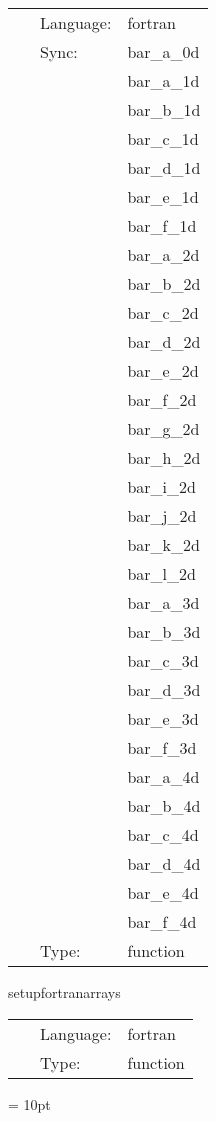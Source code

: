 \hspace{5mm}{\it use fortran arrays } 


\hspace{5mm}

 \begin{tabular*}{160mm}{cll} 
~ & Language:  & fortran \\ 
~ & Sync:  & bar\_a\_0d \\ 
~& ~ &bar\_a\_1d\\ 
~& ~ &bar\_b\_1d\\ 
~& ~ &bar\_c\_1d\\ 
~& ~ &bar\_d\_1d\\ 
~& ~ &bar\_e\_1d\\ 
~& ~ &bar\_f\_1d\\ 
~& ~ &bar\_a\_2d\\ 
~& ~ &bar\_b\_2d\\ 
~& ~ &bar\_c\_2d\\ 
~& ~ &bar\_d\_2d\\ 
~& ~ &bar\_e\_2d\\ 
~& ~ &bar\_f\_2d\\ 
~& ~ &bar\_g\_2d\\ 
~& ~ &bar\_h\_2d\\ 
~& ~ &bar\_i\_2d\\ 
~& ~ &bar\_j\_2d\\ 
~& ~ &bar\_k\_2d\\ 
~& ~ &bar\_l\_2d\\ 
~& ~ &bar\_a\_3d\\ 
~& ~ &bar\_b\_3d\\ 
~& ~ &bar\_c\_3d\\ 
~& ~ &bar\_d\_3d\\ 
~& ~ &bar\_e\_3d\\ 
~& ~ &bar\_f\_3d\\ 
~& ~ &bar\_a\_4d\\ 
~& ~ &bar\_b\_4d\\ 
~& ~ &bar\_c\_4d\\ 
~& ~ &bar\_d\_4d\\ 
~& ~ &bar\_e\_4d\\ 
~& ~ &bar\_f\_4d\\ 
~ & Type:  & function \\ 
\end{tabular*} 


\vspace{5mm}


\hspace{5mm} setupfortranarrays 

\hspace{5mm}{\it set up  fortran arrays } 


\hspace{5mm}

 \begin{tabular*}{160mm}{cll} 
~ & Language:  & fortran \\ 
~ & Type:  & function \\ 
\end{tabular*} 



\vspace{5mm}\parskip = 10pt 


